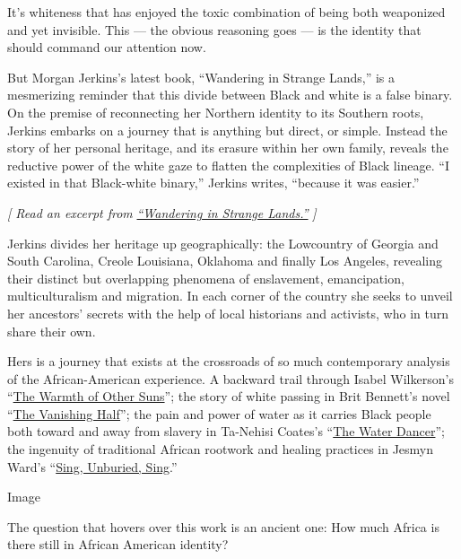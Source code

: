 It's whiteness that has enjoyed the toxic combination of being both
weaponized and yet invisible. This --- the obvious reasoning goes --- is
the identity that should command our attention now.

But Morgan Jerkins's latest book, ``Wandering in Strange Lands,'' is a
mesmerizing reminder that this divide between Black and white is a false
binary. On the premise of reconnecting her Northern identity to its
Southern roots, Jerkins embarks on a journey that is anything but
direct, or simple. Instead the story of her personal heritage, and its
erasure within her own family, reveals the reductive power of the white
gaze to flatten the complexities of Black lineage. ``I existed in that
Black-white binary,'' Jerkins writes, ``because it was easier.''

\emph{{[} Read an excerpt from}
\href{https://www.nytimes3xbfgragh.onion/2020/08/04/books/review/wandering-in-strange-lands-by-morgan-jerkins-an-excerpt.html}{\emph{``Wandering
in Strange Lands.''}} \emph{{]}}

Jerkins divides her heritage up geographically: the Lowcountry of
Georgia and South Carolina, Creole Louisiana, Oklahoma and finally Los
Angeles, revealing their distinct but overlapping phenomena of
enslavement, emancipation, multiculturalism and migration. In each
corner of the country she seeks to unveil her ancestors' secrets with
the help of local historians and activists, who in turn share their own.

Hers is a journey that exists at the crossroads of so much contemporary
analysis of the African-American experience. A backward trail through
Isabel Wilkerson's
``\href{https://www.nytimes3xbfgragh.onion/2010/08/31/books/31book.html}{The
Warmth of Other Suns}''; the story of white passing in Brit Bennett's
novel
``\href{https://www.nytimes3xbfgragh.onion/2020/05/26/books/review-vanishing-half-brit-bennett.html}{The
Vanishing Half}''; the pain and power of water as it carries Black
people both toward and away from slavery in Ta-Nehisi Coates's
``\href{https://www.nytimes3xbfgragh.onion/2019/09/24/books/review/water-dancer-ta-nehisi-coates.html}{The
Water Dancer}''; the ingenuity of traditional African rootwork and
healing practices in Jesmyn Ward's
``\href{https://www.nytimes3xbfgragh.onion/2017/09/05/books/review-sing-unburied-sing-jesmyn-ward.html}{Sing,
Unburied, Sing}.''

Image

The question that hovers over this work is an ancient one: How much
Africa is there still in African American identity?

